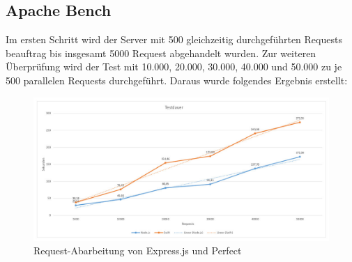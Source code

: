 \begin{figure}[H]
\end{figure}

\subsection{Apache Bench}

Im ersten Schritt wird der Server mit 500 gleichzeitig durchgeführten Requests beauftrag bis insgesamt 5000 Request abgehandelt wurden. Zur weiteren Überprüfung wird der Test mit 10.000, 20.000, 30.000, 40.000 und 50.000 zu je 500 parallelen Requests durchgeführt. Daraus wurde folgendes Ergebnis erstellt:

\begin{figure}[H]
\centering
\includegraphics[keepaspectratio, scale = 0.4]{images/time.jpg}
\caption{Request-Abarbeitung von Express.js und Perfect}
\label{fig:time}
\end{figure}

